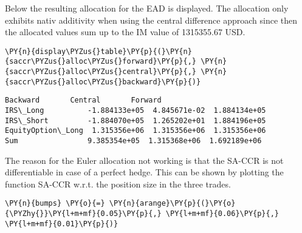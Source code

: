     Below the resulting allocation for the EAD is displayed. The allocation
only exhibits nativ additivity when using the central difference
approach since then the allocated values sum up to the IM value of
1315355.67 USD.

    
    \begin{tcolorbox}[breakable, size=fbox, boxrule=1pt, pad at break*=1mm,colback=cellbackground, colframe=cellborder]
\begin{Verbatim}[commandchars=\\\{\}]
\PY{n}{display\PYZus{}table}\PY{p}{(}\PY{n}{saccr\PYZus{}alloc\PYZus{}forward}\PY{p}{,} \PY{n}{saccr\PYZus{}alloc\PYZus{}central}\PY{p}{,} \PY{n}{saccr\PYZus{}alloc\PYZus{}backward}\PY{p}{)}
\end{Verbatim}
\end{tcolorbox}

            \begin{tcolorbox}[breakable, size=fbox, boxrule=.5pt, pad at break*=1mm, opacityfill=0]
\begin{Verbatim}[commandchars=\\\{\}]
                       Backward       Central       Forward
IRS\_Long          -1.884133e+05  4.845671e-02  1.884134e+05
IRS\_Short         -1.884070e+05  1.265202e+01  1.884196e+05
EquityOption\_Long  1.315356e+06  1.315356e+06  1.315356e+06
Sum                9.385354e+05  1.315368e+06  1.692189e+06
\end{Verbatim}
\end{tcolorbox}
        
    The reason for the Euler allocation not working is that the SA-CCR is
not differentiable in case of a perfect hedge. This can be shown by
plotting the function SA-CCR w.r.t. the position size in the three
trades.

    \begin{tcolorbox}[breakable, size=fbox, boxrule=1pt, pad at break*=1mm,colback=cellbackground, colframe=cellborder]
\begin{Verbatim}[commandchars=\\\{\}]
\PY{n}{bumps} \PY{o}{=} \PY{n}{arange}\PY{p}{(}\PY{o}{\PYZhy{}}\PY{l+m+mf}{0.05}\PY{p}{,} \PY{l+m+mf}{0.06}\PY{p}{,} \PY{l+m+mf}{0.01}\PY{p}{)}
\end{Verbatim}
\end{tcolorbox}

